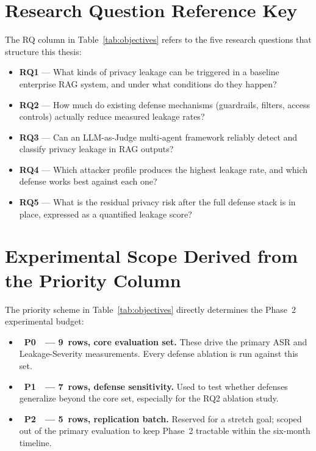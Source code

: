 \documentclass[12pt, a4paper]{report}
\newcommand{\prioHigh}{\colorbox{prioP0}{\color{white}\small\textbf{~\textsf{P0}~}}}
\newcommand{\prioMed}{\colorbox{prioP1}{\color{white}\small\textbf{~\textsf{P1}~}}}
\newcommand{\prioLow}{\colorbox{prioP2}{\color{white}\small\textbf{~\textsf{P2}~}}}
\begin{document}
\section{Research Question Reference Key}

The RQ column in Table~\ref{tab:objectives} refers to the five research
questions that structure this thesis:

\begin{itemize}[leftmargin=1.8em, itemsep=5pt]
  \item \textbf{RQ1} --- What kinds of privacy leakage can be triggered in
        a baseline enterprise RAG system, and under what conditions do they
        happen?
  \item \textbf{RQ2} --- How much do existing defense mechanisms
        (guardrails, filters, access controls) actually reduce measured
        leakage rates?
  \item \textbf{RQ3} --- Can an LLM-as-Judge multi-agent framework
        reliably detect and classify privacy leakage in RAG outputs?
  \item \textbf{RQ4} --- Which attacker profile produces the highest
        leakage rate, and which defense works best against each one?
  \item \textbf{RQ5} --- What is the residual privacy risk after the full
        defense stack is in place, expressed as a quantified leakage score?
\end{itemize}

\section{Experimental Scope Derived from the Priority Column}

The priority scheme in Table~\ref{tab:objectives} directly determines the
Phase~2 experimental budget:

\begin{itemize}[leftmargin=1.8em, itemsep=3pt]
  \item \prioHigh\ \textbf{--- 9~rows, core evaluation set.} These drive
        the primary ASR and Leakage-Severity measurements. Every defense
        ablation is run against this set.
  \item \prioMed\ \textbf{--- 7~rows, defense sensitivity.} Used to test
        whether defenses generalize beyond the core set, especially for
        the RQ2 ablation study.
  \item \prioLow\ \textbf{--- 5~rows, replication batch.} Reserved for a
        stretch goal; scoped out of the primary evaluation to keep
        Phase~2 tractable within the six-month timeline.
\end{itemize}
\end{document}
